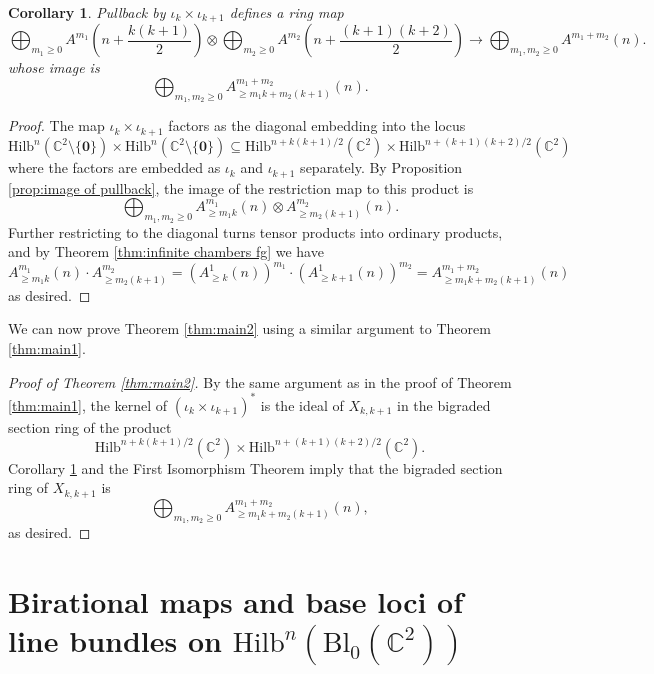 \documentclass[12pt]{amsart}
\newcommand{\Hilb}{\mathrm{Hilb}}
\newcommand{\C}{\mathbb{C}}
\newcommand{\Bl}{\mathrm{Bl}}
\numberwithin{equation}{section}
\newtheorem{corollary}[theorem]{Corollary}
\theoremstyle{definition}
\begin{document}
\begin{corollary}\label{cor:image of bigraded pullback}
    Pullback by $\iota_k\times \iota_{k+1}$ defines a ring map
    \begin{equation*}
         \bigoplus_{m_1\geq 0} A^{m_1}\left(n+\frac{k(k+1)}{2}\right)\otimes \bigoplus_{m_2\geq 0} A^{m_2}\left(n+\frac{(k+1)(k+2)}{2}\right) \to \bigoplus_{m_1,m_2\geq 0} A^{m_1+m_2}(n).
    \end{equation*}
    whose image is
    \[ \bigoplus_{m_1,m_2\geq 0} A^{m_1+m_2}_{\geq m_1k+m_2(k+1)}(n). \]
\end{corollary}

\begin{proof}
    The map $\iota_k\times\iota_{k+1}$ factors as the diagonal embedding into the locus
    \[ \Hilb^n(\C^2\setminus\{\mathbf{0}\})\times \Hilb^n(\C^2\setminus\{\mathbf{0}\}) \subseteq \Hilb^{n+k(k+1)/2}(\C^2)\times \Hilb^{n+(k+1)(k+2)/2}(\C^2) \]
    where  the factors are embedded as $\iota_k$ and $\iota_{k+1}$ separately. By Proposition \ref{prop:image of pullback}, the image of the restriction map to this product is
    \[ \bigoplus_{m_1,m_2\geq 0} A^{m_1}_{\geq m_1 k}(n) \otimes A^{m_2}_{\geq m_2 (k+1)}(n). \]
    Further restricting to the diagonal turns tensor products into ordinary products, and by Theorem \ref{thm:infinite chambers fg} we have
    \[ A^{m_1}_{\geq m_1 k}(n) \cdot A^{m_2}_{\geq m_2 (k+1)} = \left(A^{1}_{\geq k}(n)\right)^{m_1} \cdot \left(A^{1}_{\geq k+1}(n)\right)^{m_2} = A^{m_1+m_2}_{\geq m_1k+m_2(k+1)}(n) \]
    as desired.
\end{proof}

We can now prove Theorem \ref{thm:main2} using a similar argument to Theorem \ref{thm:main1}.

\begin{proof}[Proof of Theorem \ref{thm:main2}]
    By the same argument as in the proof of Theorem \ref{thm:main1}, the kernel of $(\iota_k\times \iota_{k+1})^*$ is the ideal of $X_{k,k+1}$ in the bigraded section ring of the product 
    \[ \Hilb^{n+k(k+1)/2}(\C^2)\times \Hilb^{n+(k+1)(k+2)/2}(\C^2). \]
    Corollary \ref{cor:image of bigraded pullback} and the First Isomorphism Theorem imply that the bigraded section ring of $X_{k,k+1}$ is 
    \[ \bigoplus_{m_1,m_2\geq 0} A^{m_1+m_2}_{\geq m_1k+m_2(k+1)}(n), \]
    as desired. 
\end{proof}


\section{Birational maps and base loci of line bundles on $\Hilb^n(\Bl_0 (\C^2))$}\label{sec:base locus}
\end{document}
